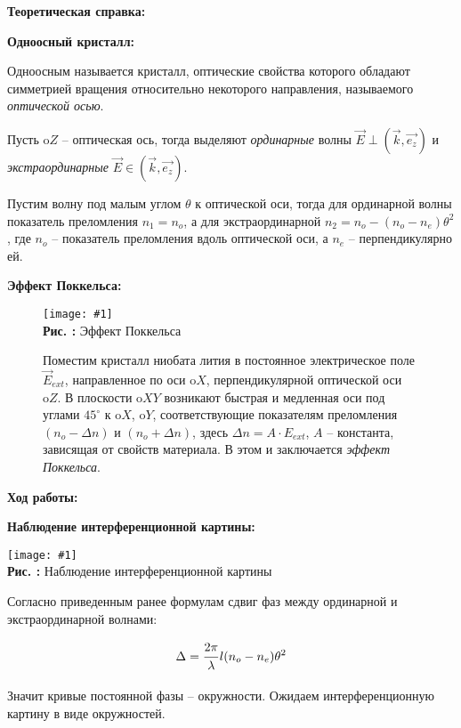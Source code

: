 \documentclass{beamer}
\newcommand{\sfrac}[2]{\dfrac{\strut #1}{\strut #2}}
\newcounter{picture}
\newcommand{\embed}[3]{\begin{center}
		\texttt{[image: \#1]}
		\\\textbf{Рис. \thepicture:} #3
		\label{pic_\thepicture}
		\addtocounter{picture}{1}
\end{center}}
\begin{document}
	\begin{frame}
		{\large \textbf{Теоретическая справка:}}
		
		\textbf{Одноосный кристалл:}
		
		Одноосным называется кристалл, оптические свойства которого обладают симметрией вращения относительно некоторого направления, называемого \textit{оптической осью}.
		
		Пусть $\mathrm{o}Z$ -- оптическая ось, тогда выделяют \textit{ординарные} волны $\vec{E} \perp (\vec{k}, \vec{e_z})$ и \textit{экстраординарные} $\vec{E} \in (\vec{k}, \vec{e_z})$.
		
		Пустим волну под малым углом $\theta$ к оптической оси, тогда для ординарной волны показатель преломления $n_1 = n_o$, а для экстраординарной $n_2 = n_o- (n_o - n_e)\theta^2$, где $n_o$ -- показатель преломления вдоль оптической оси, а $n_e$ -- перпендикулярно ей.
	\end{frame}

	\begin{frame}
		\textbf{Эффект Поккельса:}
		
		\begin{figure}[h]
			\begin{minipage}{0.3\linewidth}
				\embed{PIC_2.png}{0.1}{Эффект Поккельса}
			\end{minipage}
			\begin{minipage}{0.6\linewidth}
				Поместим кристалл ниобата лития в постоянное электрическое поле $\vec{E}_{ext}$, направленное по оси $\mathrm{o}X$, перпендикулярной оптической оси $\mathrm{o}Z$. В плоскости $\mathrm{o}XY$ возникают быстрая и медленная оси под углами $45^\circ$ к $\mathrm{o}X$, $\mathrm{o}Y$, соответствующие показателям преломления $(n_o - \Delta n)$ и $(n_o + \Delta n)$, здесь $\Delta n = A\cdot E_{ext}$, $A$ -- константа, зависящая от свойств материала. В этом и заключается \textit{эффект Поккельса}.
			\end{minipage}
		\end{figure}
	\end{frame}

	\begin{frame}
		{\large \textbf{Ход работы:}}
		
		\textbf{Наблюдение интерференционной картины:}
		
		\embed{PPIC_1.png}{0.035}{Наблюдение интерференционной картины}
		
		Согласно приведенным ранее формулам сдвиг фаз между ординарной и экстраординарной волнами:
		
		$$ \Delta = \sfrac{2\pi}{\lambda}  l(n_o - n_e)\theta^2$$
		
		Значит кривые постоянной фазы -- окружности. Ожидаем интерференционную картину в виде окружностей.
	\end{frame}
\end{document}
